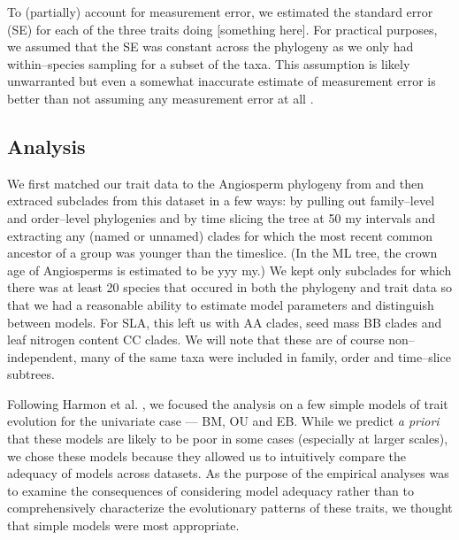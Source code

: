 \documentclass[a4paper,12pt]{article}
\begin{document}
To (partially) account for measurement error, we estimated the standard error (SE) for each of the three traits doing [something here]. For practical purposes, we assumed that the SE was constant across the phylogeny as we only had within--species sampling for a subset of the taxa. This assumption is likely unwarranted but even a somewhat inaccurate estimate of measurement error is better than not assuming any measurement error at all \citep{Hansen2012}.

\subsection{Analysis}

We first matched our trait data to the Angiosperm phylogeny from \citet{Zanne2013} and then extraced subclades from this dataset in a few ways: by pulling out family--level and order--level phylogenies and by time slicing the tree at 50 my intervals and extracting any (named or unnamed) clades for which the most recent common ancestor of a group was younger than the timeslice. (In the ML tree, the crown age of Angiosperms is estimated to be yyy my.) We kept only subclades for which there was at least 20 species that occured in both the phylogeny and trait data so that we had a reasonable ability to estimate model parameters and distinguish between models. For SLA, this left us with AA clades, seed mass BB clades and leaf nitrogen content CC clades. We will note that these are of course non--independent, many of the same taxa were included in family, order and time--slice subtrees. 

Following Harmon et al. \citep{Harmon2010}, we focused the analysis on a few simple models of trait evolution for the univariate case --- BM, OU and EB. While we predict \textit{a priori} that these models are likely to be poor in some cases (especially at larger scales), we chose these models because they allowed us to intuitively compare the adequacy of models across datasets. As the purpose of the empirical analyses was to examine the consequences of considering model adequacy rather than to comprehensively characterize the evolutionary patterns of these traits, we thought that simple models were most appropriate.
\end{document}
